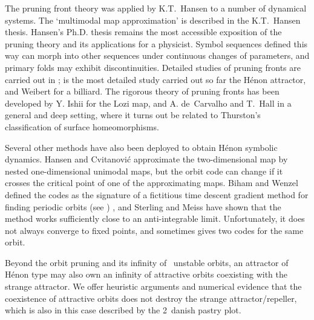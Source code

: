 {The pruning front theory was applied by K.T.~Hansen to a number of
dynamical systems. The `multimodal
map approximation' is described in the K.T.~Hansen thesis.
Hansen's Ph.D. thesis remains the most accessible exposition
of the pruning theory and its applications for a physicist. Symbol
sequences defined this way can morph into other sequences under
continuous changes of parameters, and primary folds may
exhibit discontinuities.
Detailed studies of pruning fronts are carried out in
;  is the most detailed
study carried out so far the H\'enon attractor, and Weibert
\etal{} for a billiard.
The rigorous theory of pruning fronts has been developed by Y.
Ishii for the Lozi map, and A. de~Carvalho and
T.~Hall in a general and deep setting,
where it turns out be related to {Thurston}'s classification of surface
homeomorphisms.

Several other methods have also been deployed to obtain H\'enon symbolic
dynamics. Hansen and Cvitanovi\'c approximate the
two-dimensional map by nested one-dimensional unimodal maps, but
the orbit code can change if it crosses the critical point of one of the
approximating maps. Biham and Wenzel defined the codes as the
signature of a fictitious time descent gradient method for finding
periodic orbits\ifdasbuch
(see )
    \else
    \fi,
and Sterling and Meiss have shown that the method works
sufficiently close to an anti-integrable limit. Unfortunately, it does
not always converge to fixed points, and sometimes gives two codes for
the same orbit.

Beyond the orbit pruning and its infinity of \admissible\ unstable
orbits, an attractor of H\'enon type may also own an infinity of
attractive orbits coexisting with the strange
attractor. We offer heuristic arguments  and
numerical evidence that the coexistence of attractive orbits does not
destroy the strange attractor/repeller, which is also in this case
described by the 2\dmn\ danish pastry plot.

}
